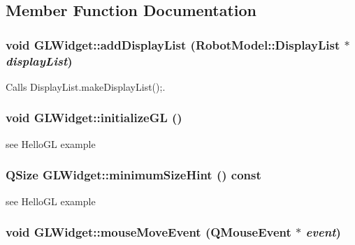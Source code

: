 \subsection{Member Function Documentation}
\hypertarget{class_g_l_widget_acd20f92385f2b2190ca708a57d3c3c42}{
\subsubsection[{addDisplayList}]{\setlength{\rightskip}{0pt plus 5cm}void GLWidget::addDisplayList ({\bf RobotModel::DisplayList} $\ast$ {\em displayList})}}
\label{class_g_l_widget_acd20f92385f2b2190ca708a57d3c3c42}


Calls DisplayList.makeDisplayList();. \hypertarget{class_g_l_widget_a7fab13e8cc9fc0730ca54c08b2c923a7}{
\subsubsection[{initializeGL}]{\setlength{\rightskip}{0pt plus 5cm}void GLWidget::initializeGL ()}}
\label{class_g_l_widget_a7fab13e8cc9fc0730ca54c08b2c923a7}


see HelloGL example \hypertarget{class_g_l_widget_ade3142625c1bfda0576e419b176cf8b1}{
\subsubsection[{minimumSizeHint}]{\setlength{\rightskip}{0pt plus 5cm}QSize GLWidget::minimumSizeHint () const}}
\label{class_g_l_widget_ade3142625c1bfda0576e419b176cf8b1}


see HelloGL example \hypertarget{class_g_l_widget_a9043bac13d6f0a5307ea5c7f9b3caa50}{
\subsubsection[{mouseMoveEvent}]{\setlength{\rightskip}{0pt plus 5cm}void GLWidget::mouseMoveEvent (QMouseEvent $\ast$ {\em event})}}
\label{class_g_l_widget_a9043bac13d6f0a5307ea5c7f9b3caa50}


